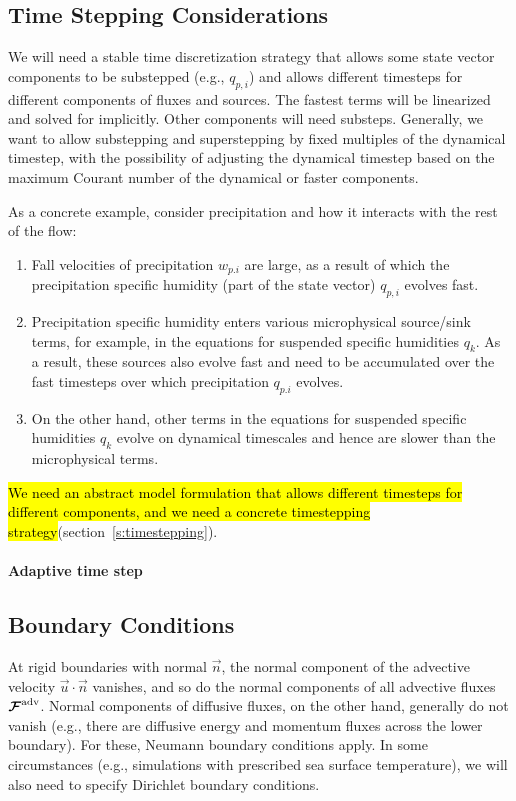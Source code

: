 \documentclass{article}
\begin{document}
\subsection{Time Stepping Considerations}

We will need a stable time discretization strategy that allows some state vector components to be substepped (e.g., $q_{p,i}$) and allows different timesteps for different components of fluxes and sources. The fastest terms will be linearized and solved for implicitly. Other components will need substeps. Generally, we want to allow substepping and superstepping by fixed multiples of the dynamical timestep, with the possibility of adjusting the dynamical timestep based on the maximum Courant number of the dynamical or faster components. 

As a concrete example, consider precipitation and how it interacts with the rest of the flow:
\begin{enumerate}
\item Fall velocities of precipitation $w_{p. i}$ are large, as a result of which the precipitation specific humidity (part of the state vector) $q_{p,i}$ evolves fast.
\item Precipitation specific humidity enters various microphysical source/sink terms, for example, in the equations for suspended specific humidities $q_k$. As a result, these sources also evolve fast and need to be accumulated over the fast timesteps over which precipitation $q_{p.i}$ evolves.
\item On the other hand, other terms in the equations for suspended specific humidities $q_k$ evolve on dynamical timescales and hence are slower than the microphysical terms.
\end{enumerate}
\hl{We need an abstract model formulation that allows different timesteps for different components, and we need a concrete timestepping strategy}(section~\ref{s:timestepping}).

\paragraph{Adaptive time step}


\subsection{Boundary Conditions}

At rigid boundaries with normal $\vec{n}$, the normal component of the advective velocity $\vec{u} \cdot \vec{n}$ vanishes, and so do the normal components of all advective fluxes $\boldsymbol{{\mathcal{F}}}^{\mathrm{adv}}$. Normal components of diffusive fluxes, on the other hand, generally do not vanish (e.g., there are diffusive energy and momentum fluxes across the lower boundary). For these, Neumann boundary conditions apply. In some circumstances (e.g., simulations with prescribed sea surface temperature), we will also need to specify Dirichlet boundary conditions. 
\end{document}
